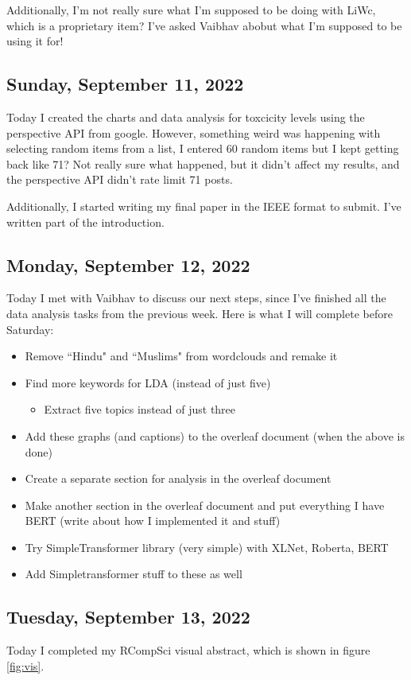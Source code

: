 \documentclass[11pt,letterpaper]{article}
\begin{document}
Additionally, I'm not really sure what I'm supposed to be doing with LiWc, which is a proprietary item? I've asked Vaibhav abobut what I'm supposed to be using it for!

\subsection{Sunday, September 11, 2022}
Today I created the charts and data analysis for toxcicity levels using the perspective API from google. However, something weird was happening with selecting random items from a list, I entered 60 random items but I kept getting back like 71? Not really sure what happened, but it didn't affect my results, and the perspective API didn't rate limit 71 posts.

Additionally, I started writing my final paper in the IEEE format to submit. I've written part of the introduction.

\subsection{Monday, September 12, 2022}
Today I met with Vaibhav to discuss our next steps, since I've finished all the data analysis tasks from the previous week. Here is what I will complete before Saturday:
\begin{itemize}
    \item Remove ``Hindu" and ``Muslims" from wordclouds and remake it
    \item Find more keywords for LDA (instead of just five)
    \begin{itemize}
        \item Extract five topics instead of just three
    \end{itemize}
    \item Add these graphs (and captions) to the overleaf document (when the above is done)
    \item Create a separate section for analysis in the overleaf document
    \item Make another section in the overleaf document and put everything I have BERT (write about how I implemented it and stuff)
    \item Try SimpleTransformer library (very simple) with XLNet, Roberta, BERT
    \item Add Simpletransformer stuff to these as well
\end{itemize}

\subsection{Tuesday, September 13, 2022}
Today I completed my RCompSci visual abstract, which is shown in figure \ref{fig:vis}.
\end{document}
